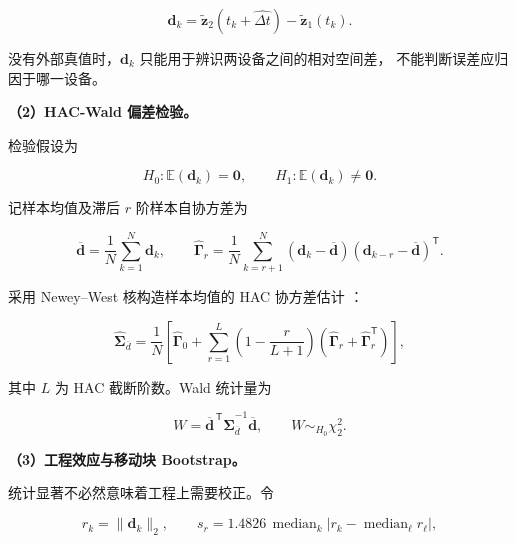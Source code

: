 \begin{equation}
\mathbf d_k=
\widetilde{\mathbf z}_2(t_k+\widehat{\Delta t})
-\widetilde{\mathbf z}_1(t_k).
\label{eq:q3-aligned-residual}
\end{equation}

没有外部真值时，\(\mathbf d_k\) 只能用于辨识两设备之间的相对空间差，
不能判断误差应归因于哪一设备。

\noindent\textbf{（2）HAC-Wald 偏差检验。}

检验假设为

\begin{equation}
H_0:\mathbb E(\mathbf d_k)=\mathbf 0,
\qquad
H_1:\mathbb E(\mathbf d_k)\ne\mathbf 0.
\label{eq:q3-hypothesis}
\end{equation}

记样本均值及滞后 \(r\) 阶样本自协方差为

\begin{equation}
\overline{\mathbf d}
=\frac{1}{N}\sum_{k=1}^{N}\mathbf d_k,
\qquad
\widehat{\boldsymbol\Gamma}_r
=\frac{1}{N}\sum_{k=r+1}^{N}
(\mathbf d_k-\overline{\mathbf d})
(\mathbf d_{k-r}-\overline{\mathbf d})^\mathsf T.
\label{eq:q3-autocovariance}
\end{equation}

采用 Newey--West 核构造样本均值的 HAC 协方差估计
\cite{neweywest1987}：

\begin{equation}
\widehat{\boldsymbol\Sigma}_{\overline d}
=\frac{1}{N}
\left[
\widehat{\boldsymbol\Gamma}_0+
\sum_{r=1}^{L}
\left(1-\frac{r}{L+1}\right)
\left(
\widehat{\boldsymbol\Gamma}_r+
\widehat{\boldsymbol\Gamma}_r^\mathsf T
\right)
\right],
\label{eq:q3-hac-covariance}
\end{equation}

其中 \(L\) 为 HAC 截断阶数。Wald 统计量为

\begin{equation}
W=\overline{\mathbf d}^{\,\mathsf T}
\widehat{\boldsymbol\Sigma}_{\overline d}^{-1}
\overline{\mathbf d},
\qquad
W\mathop{\sim}_{H_0}\chi_2^2.
\label{eq:q3-wald}
\end{equation}

\noindent\textbf{（3）工程效应与移动块 Bootstrap。}

统计显著不必然意味着工程上需要校正。令

\begin{equation}
r_k=\|\mathbf d_k\|_2,\qquad
s_r=1.4826\,
\operatorname{median}_k
\left|r_k-\operatorname{median}_{\ell}r_\ell\right|,
\label{eq:q3-residual-scale}
\end{equation}


